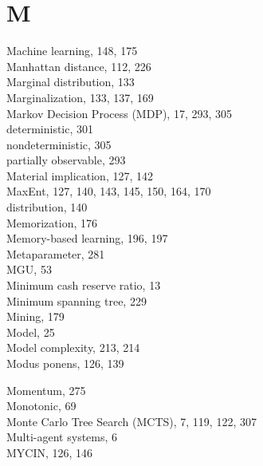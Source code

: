 \documentclass[10pt]{article}
\begin{document}
\section*{M}
Machine learning, 148, 175\\
Manhattan distance, 112, 226\\
Marginal distribution, 133\\
Marginalization, 133, 137, 169\\
Markov Decision Process (MDP), 17, 293, 305\\
deterministic, 301\\
nondeterministic, 305\\
partially observable, 293\\
Material implication, 127, 142\\
MaxEnt, 127, 140, 143, 145, 150, 164, 170\\
distribution, 140\\
Memorization, 176\\
Memory-based learning, 196, 197\\
Metaparameter, 281\\
MGU, 53\\
Minimum cash reserve ratio, 13\\
Minimum spanning tree, 229\\
Mining, 179\\
Model, 25\\
Model complexity, 213, 214\\
Modus ponens, 126, 139

Momentum, 275\\
Monotonic, 69\\
Monte Carlo Tree Search (MCTS), 7, 119, 122, 307\\
Multi-agent systems, 6\\
MYCIN, 126, 146
\end{document}
